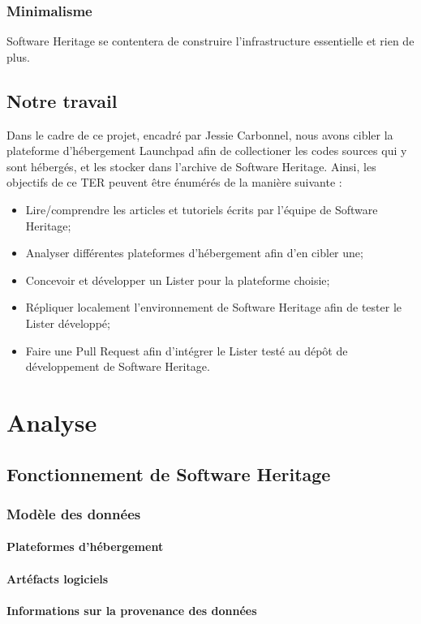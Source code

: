 \documentclass[12pt,a4paper]{report}
\begin{document}
\subsection{Minimalisme}
Software Heritage se contentera de construire l'infrastructure essentielle et rien de plus.
\section{Notre travail}
Dans le cadre de ce projet, encadré par Jessie Carbonnel, nous avons cibler la plateforme d'hébergement Launchpad afin de collectioner les codes sources qui y sont hébergés, et les stocker dans l'archive de Software Heritage. Ainsi, les objectifs de ce TER peuvent être énumérés de la manière suivante :
\begin{itemize}
\item Lire/comprendre les articles et tutoriels écrits par l'équipe de Software Heritage;
\item Analyser différentes plateformes d'hébergement afin d'en cibler une;
\item Concevoir et développer un Lister pour la plateforme choisie;
\item Répliquer localement l'environnement de Software Heritage afin de tester le Lister développé;
\item Faire une Pull Request afin d'intégrer le Lister testé au dépôt de développement de Software Heritage.
\end{itemize}

\chapter{Analyse}
\section{Fonctionnement de Software Heritage}
	\subsection{Modèle des données}
		\subsubsection{Plateformes d'hébergement}
		\subsubsection{Artéfacts logiciels}
		\subsubsection{Informations sur la provenance des données}
\end{document}
